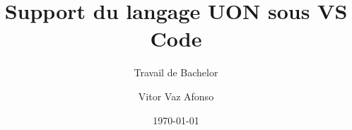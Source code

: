 \author{Vitor Vaz Afonso}


\title{Support du langage UON sous VS Code}

\subtitle{Travail de Bachelor}


\date{\today}


